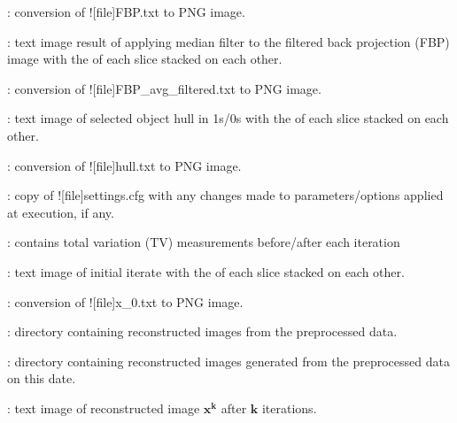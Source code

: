 \begin{tcbenvironment}
\begin{tcbparagraph}
\begin{ThinEnum}
\begin{ThinEnum}
\begin{ThinEnum}
\begin{ThinEnum}
\begin{ThinEnum}
\begin{ThinEnum}
\begin{ThinEnum}
\begin{ThinEnum}
\begin{ThinEnum}
                                        	\item {} : conversion of \docentry![file]{FBP.txt} to PNG image.
                                        	\item {} : text image result of applying median filter to the filtered back projection (FBP) image with the \xyplane* of each slice stacked on each other.
                                        	\item {} : conversion of \docentry![file]{FBP\_avg\_filtered.txt} to PNG image.
                                        	\item {} : text image of selected object hull in 1s/0s with the \xyplane* of each slice stacked on each other.
                                        	\item {} : conversion of \docentry![file]{hull.txt} to PNG image.
                                        	\item {} : copy of \docentry![file]{settings.cfg} with any changes made to parameters/options applied at execution, if any.
                                        	\item {} : contains total variation (TV) measurements before/after each iteration
                                        	\item {} : text image of initial iterate with the \xyplane* of each slice stacked on each other.
                                        	\item {} : conversion of \docentry![file]{x\_0.txt} to PNG image.
                                        	\item {} : directory containing reconstructed images from the preprocessed data.
                                        	\begin{ThinEnum}
                                            \item {} : directory containing reconstructed images generated from the preprocessed data on this date.
                                                \begin{ThinEnum}
                                                    \item {} : text image of reconstructed image $\boldsymbol{x^k}$ after $\boldsymbol{k}$ iterations.

\end{ThinEnum}
\end{ThinEnum}
\end{ThinEnum}
\end{ThinEnum}
\end{ThinEnum}
\end{ThinEnum}
\end{ThinEnum}
\end{ThinEnum}
\end{ThinEnum}
\end{ThinEnum}
\end{ThinEnum}
\end{tcbparagraph}
\end{tcbenvironment}

